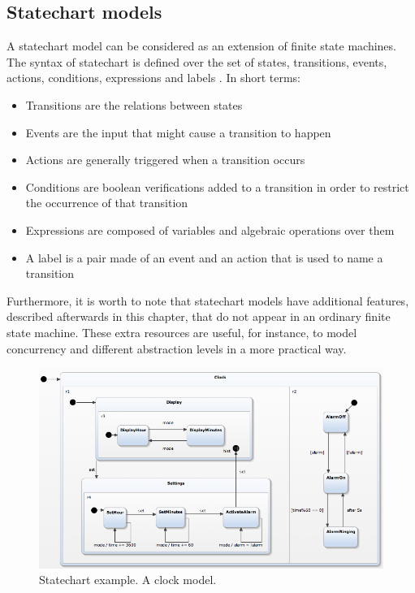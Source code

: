 \subsection{Statechart models}

A statechart model can be considered as an extension of finite state machines. The syntax of statechart is defined over the set of states, transitions, events, actions, conditions, expressions and labels \cite{harel87:semantics_statecharts}. In short terms:

\begin{itemize}

\item Transitions are the relations between states

\item Events are the input that might cause a transition to happen

\item Actions are generally triggered when a transition occurs

\item Conditions are boolean verifications added to a transition in order to restrict the occurrence of that transition

\item Expressions are composed of variables and algebraic operations over them

\item A label is a pair made of an event and an action that is used to name a transition
\end{itemize}

Furthermore, it is worth to note that statechart models have additional features, described afterwards in this chapter, that do not appear in an ordinary finite state machine. These extra resources are useful, for instance, to model concurrency and different abstraction levels in a more practical way.

\begin{figure}[htb]
\includegraphics[width=1.0\textwidth]{figuras/statechartExample1}
\caption{\label{fig:stateClock}Statechart example. A clock model.}
\end{figure}

